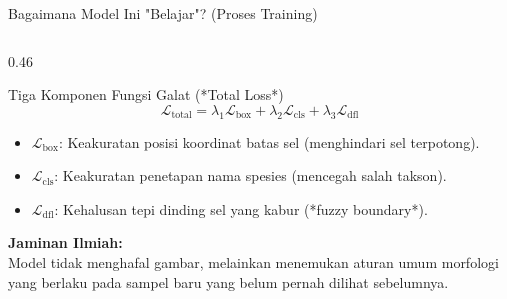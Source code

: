 \documentclass[aspectratio=169, 10pt]{beamer}
\begin{document}
\begin{frame}{Bagaimana Model Ini "Belajar"? (Proses Training)}
\begin{columns}[T]
        \begin{column}{0.46\textwidth}
            \begin{biocard}{Tiga Komponen Fungsi Galat (*Total Loss*)}
                \scriptsize
                $$\mathcal{L}_{\text{total}} = \lambda_1 \mathcal{L}_{\text{box}} + \lambda_2 \mathcal{L}_{\text{cls}} + \lambda_3 \mathcal{L}_{\text{dfl}}$$
                \begin{itemize}\setlength\itemsep{2pt}
                    \item $\mathcal{L}_{\text{box}}$: Keakuratan posisi koordinat batas sel (menghindari sel terpotong).
                    \item $\mathcal{L}_{\text{cls}}$: Keakuratan penetapan nama spesies (mencegah salah takson).
                    \item $\mathcal{L}_{\text{dfl}}$: Kehalusan tepi dinding sel yang kabur (*fuzzy boundary*).
                \end{itemize}
                \tcblower
                \textbf{\color{OceanTeal}Jaminan Ilmiah:}\\
                Model tidak menghafal gambar, melainkan menemukan aturan umum morfologi yang berlaku pada sampel baru yang belum pernah dilihat sebelumnya.
            \end{biocard}
        \end{column}
    \end{columns}
\end{frame}

\end{document}
